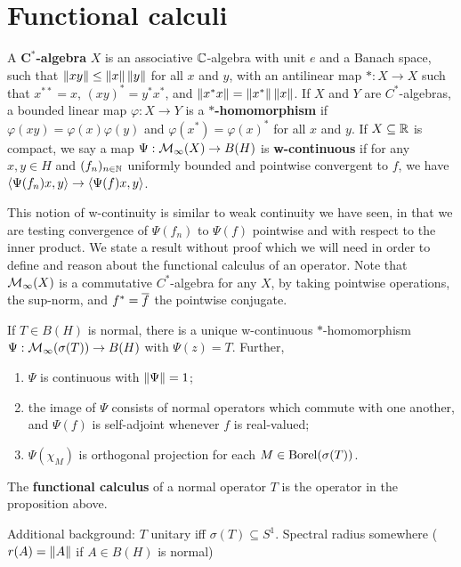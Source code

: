 \documentclass[10pt]{amsart}
\begin{document}
\section{Functional calculi}
A \textbf{$\mathbf{C^*}$-algebra} $X$ is an associative $\mathbb{C}$-algebra with unit $e$ and a Banach space, such that $\left\| xy \right\| \leq \left\| x \right\|\left\| y \right\|$ for all $x$ and $y$, with an antilinear map $* : X \to X$ such that $x^{**} = x$, $(xy)^* = y^*x^*$, and $\left\| x^*x \right\| = \left\| x^* \right\|\left\| x \right\|$. If $X$ and $Y$ are $C^*$-algebras, a bounded linear map $\varphi : X \to Y$ is a \textbf{$\mathbf{*}$-homomorphism} if $\varphi(xy) = \varphi(x)\varphi(y)$ and $\varphi(x^*) = \varphi(x)^*$ for all $x$ and $y$. %
If $X \subseteq \mathbb{R}$ is compact, we say a map $\Psi : \mathcal{M}_\infty(X) \to B(H)$ is \textbf{w-continuous} if for any $x, y \in H$ and $(f_n)_{n \in \mathbb{N}}$ uniformly bounded and pointwise convergent to $f$, we have $\left\langle \Psi(f_n)x, y \right\rangle \to \left\langle \Psi(f)x, y \right\rangle$.

This notion of w-continuity is similar to weak continuity we have seen, in that we are testing convergence of $\Psi(f_n)$ to $\Psi(f)$ pointwise and with respect to the inner product. We state a result without proof which we will need in order to define and reason about the functional calculus of an operator. Note that $\mathcal{M}_\infty(X)$ is a commutative $C^*$-algebra for any $X$, by taking pointwise operations, the sup-norm, and $f^* = \overline{f}$ the pointwise conjugate.
\begin{proposition}\label{funccalc}
    If $T \in B(H)$ is normal, there is a unique w-continuous $*$-homomorphism $\Psi : \mathcal{M}_\infty(\sigma(T)) \to B(H)$ with $\Psi(z) = T$. Further, 
    \begin{enumerate}
        \item $\Psi$ is continuous with $\left\| \Psi \right\| = 1$;
        \item the image of $\Psi$ consists of normal operators which commute with one another, and $\Psi(f)$ is self-adjoint whenever $f$ is real-valued;
        \item $\Psi(\chi_M)$ is orthogonal projection for each $M \in \operatorname{Borel}(\sigma(T))$.
    \end{enumerate}
\end{proposition}
\begin{definition}
    The \textbf{functional calculus} of a normal operator $T$ is the operator in the proposition above.
\end{definition}
Additional background: $T$ unitary iff $\sigma(T) \subseteq S^1$. Spectral radius somewhere ($r(A) = \left\| A \right\|$ if $A \in B(H)$ is normal)
\end{document}
